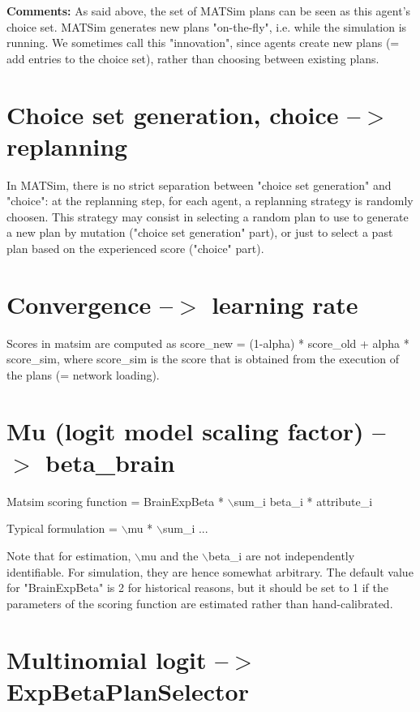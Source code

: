 \documentclass[a4paper,11pt]{report}
\begin{document}
\textbf{Comments:} As said above, the set of MATSim plans can   be seen as this agent's choice set. MATSim generates new plans   "on-the-fly", i.e. while the simulation is running. We sometimes  call  this "innovation", since agents create new plans (= add entries to  the  choice set), rather than choosing between existing plans.

\vfill\eject
\section{Choice set generation, choice --$>$ replanning}

In MATSim, there is no strict separation between "choice set  generation" and "choice": at the replanning step, for each agent, a  replanning strategy is randomly choosen. This strategy may consist in  selecting a random plan to use to generate a new plan by mutation  ("choice set generation" part), or just to select a past plan based on  the experienced score ("choice" part).

\vfill\eject
\section{Convergence --$>$ learning rate}

Scores in matsim are computed as score\_new = (1-alpha) * score\_old +   alpha * score\_sim, where score\_sim is the score that is obtained from   the execution of the plans (= network loading).

\vfill\eject
\section{Mu (logit model scaling factor) --$>$ beta\_brain}


Matsim scoring function = BrainExpBeta * $\backslash$sum\_i beta\_i * attribute\_i

Typical formulation = $\backslash$mu * $\backslash$sum\_i ...

Note that for estimation, $\backslash$mu and the $\backslash$beta\_i are not independently  identifiable. For simulation, they are hence somewhat arbitrary. The  default value for "BrainExpBeta" is 2 for historical reasons, but it  should be set to 1 if the parameters of the scoring function are  estimated rather than hand-calibrated.

\vfill\eject
\section{Multinomial logit --$>$ ExpBetaPlanSelector}
\end{document}
